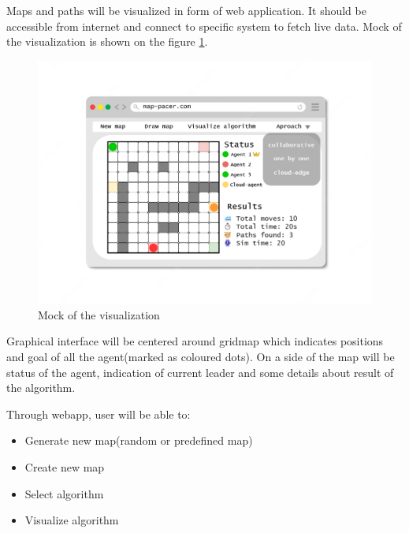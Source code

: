 Maps and paths will be visualized in form of web application. It should be accessible from internet and connect to specific system to fetch live data. Mock of the visualization is shown on the figure \ref{fig:vis_mock}. 

\begin{figure}[H]
    \centering
    \includegraphics[width=\textwidth]{pictures/frontenf_mock.png}
    \caption{ Mock of the visualization }
    \label{fig:vis_mock}
\end{figure}

Graphical interface will be centered around gridmap which indicates positions and goal of all the agent(marked as coloured dots). On a side of the map will be status of the agent, indication of current leader and some details about result of the algorithm.

Through webapp, user will be able to:
\begin{itemize}
    \item Generate new map(random or predefined map)
    \item Create new map
    \item Select algorithm
    \item Visualize algorithm
\end{itemize}